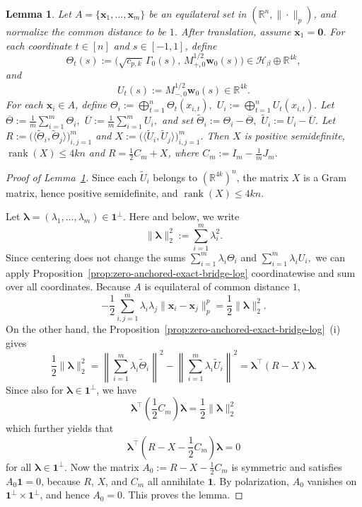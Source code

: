 \documentclass[11pt]{article}
\newtheorem{lemma}[theorem]{Lemma}
\theoremstyle{definition}
\begin{document}
\begin{lemma}\label{lem:centered-gram-log}
Let
\(
A=\{\boldsymbol{x}_1,\dots,\boldsymbol{x}_m\}
\)
be an equilateral set in $(\mathbb R^n,\|\cdot\|_p)$, and normalize the common distance to be $1$. After translation,
assume
\(
\boldsymbol{x}_1=\boldsymbol{0}.
\)
For each coordinate $t\in[n]$ and $s\in[-1,1]$, define
\[
\Theta_t(s):=
\bigl(\sqrt{c_{p,k}}\,\Gamma_0(s),\,M_{+,0}^{1/2}\boldsymbol w_0(s)\bigr)
\in
\mathcal H_\beta\oplus\mathbb R^{4k},
\]
and
\[
U_t(s):=M_{-,0}^{1/2}\boldsymbol w_0(s)\in\mathbb R^{4k}.
\]
For each $\boldsymbol{x}_i\in A$, define
\(
\Theta_i
:=
\bigoplus_{t=1}^n \Theta_t(x_{i,t}),
\)
\(
U_i
:=
\bigoplus_{t=1}^n U_t(x_{i,t}).
\)
Let
\(
\overline{\Theta}:=\frac1m\sum_{i=1}^m \Theta_i,
\)
\(
\overline{U}:=\frac1m\sum_{i=1}^m U_i,
\)
and set
\(
\widetilde\Theta_i:=\Theta_i-\overline{\Theta},\)
\(
\widetilde U_i:=U_i-\overline{U}.
\)
Let
\(
R:=\bigl(\langle \widetilde\Theta_i,\widetilde\Theta_j\rangle\bigr)_{i,j=1}^m\) and
\(
X:=\bigl(\langle \widetilde U_i,\widetilde U_j\rangle\bigr)_{i,j=1}^m.
\)
Then $X$ is positive semidefinite, $\operatorname{rank}(X)\le 4kn$ and
\(R=\frac12 C_m+X\), where
\(
C_m:=I_m-\frac{1}{m}J_m.
\)
\end{lemma}
\begin{proof}[Proof of Lemma~\ref{lem:centered-gram-log}]
Since each $\widetilde U_i$ belongs to $(\mathbb R^{4k})^n$, the matrix $X$ is a
Gram matrix, hence positive semidefinite, and
\(
\operatorname{rank}(X)\le 4kn.
\)

Let $\boldsymbol{\lambda}=(\lambda_1,\dots,\lambda_m)\in \boldsymbol{1}^\perp$. Here and below, we write
\[
\|\boldsymbol{\lambda}\|_2^2:=\sum_{i=1}^m\lambda_i^2.
\] Since centering does
not change the sums
\(
\sum_{i=1}^m \lambda_i\Theta_i\)
and
\(
\sum_{i=1}^m \lambda_iU_i,
\)
we can apply Proposition~\ref{prop:zero-anchored-exact-bridge-log}
coordinatewise and sum over all coordinates. Because $A$ is equilateral of common
distance $1$,
\[
-\frac12\sum_{i,j=1}^m \lambda_i\lambda_j \|\boldsymbol{x}_i-\boldsymbol{x}_j\|_p^p
=
\frac12\|\boldsymbol{\lambda}\|_2^2.
\]
On the other hand, the Proposition~\ref{prop:zero-anchored-exact-bridge-log}~(i) gives
\[
\frac12\|\boldsymbol{\lambda}\|_2^2
=
\left\|\sum_{i=1}^m \lambda_i\widetilde\Theta_i\right\|^2
-
\left\|\sum_{i=1}^m \lambda_i\widetilde U_i\right\|^2
=
\boldsymbol{\lambda}^\top (R-X)\boldsymbol{\lambda}.
\]
Since also for \(\boldsymbol{\lambda}\in\boldsymbol{1}^\perp\), we have
\[
\boldsymbol{\lambda}^\top \left(\frac12 C_m\right)\boldsymbol{\lambda}=\frac12\|\boldsymbol{\lambda}\|_2^2
\]
which further yields that
\[
\boldsymbol{\lambda}^\top\left(R-X-\frac12 C_m\right)\boldsymbol{\lambda}=0
\]
for all \(\boldsymbol{\lambda}\in \boldsymbol{1}^\perp.\) Now the matrix
\(
A_0:=R-X-\frac12 C_m
\)
is symmetric and satisfies $A_0\boldsymbol{1}=0$, because $R$, $X$, and $C_m$ all
annihilate $\boldsymbol{1}$. By polarization, $A_0$ vanishes on
$\boldsymbol{1}^\perp\times \boldsymbol{1}^\perp$, and hence $A_0=0$. This proves the lemma.
    
\end{proof}
\end{document}
